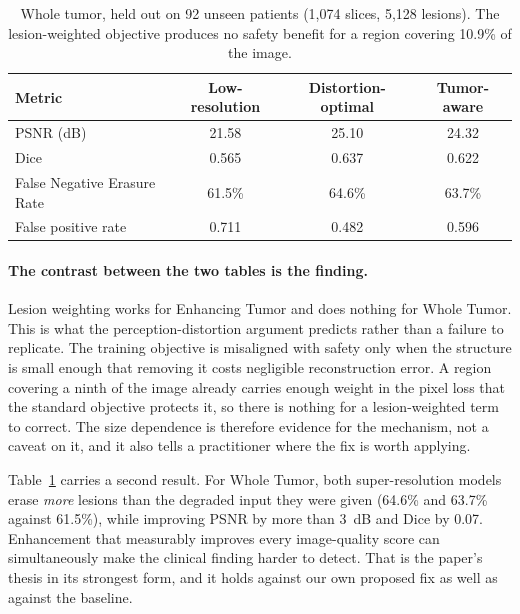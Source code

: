 \documentclass[11pt,a4paper]{article}
\newcommand{\FNER}{False Negative Erasure Rate\xspace}
\newcommand{\SR}{super-resolution\xspace}
\begin{document}
\begin{table}[h]
  \caption{Whole tumor, held out on 92 unseen patients (1,074 slices, 5,128 lesions). The lesion-weighted objective produces no safety benefit for a region covering 10.9\% of the image.}
  \label{tab:curve}
  \centering
  \renewcommand{\arraystretch}{1.15}
  \begin{tabular}{@{}lccc@{}}
    \toprule
    \textbf{Metric} & \textbf{Low-resolution} & \textbf{Distortion-optimal} & \textbf{Tumor-aware} \\
    \midrule
    PSNR (dB)     & 21.58 & 25.10 & 24.32 \\
    Dice          & 0.565 & 0.637 & 0.622 \\
    \FNER         & 61.5\% & 64.6\% & 63.7\% \\
    False positive rate & 0.711 & 0.482 & 0.596 \\
    \bottomrule
  \end{tabular}
\end{table}

\paragraph{The contrast between the two tables is the finding.}
Lesion weighting works for Enhancing Tumor and does nothing for Whole Tumor. This is what the perception-distortion argument predicts rather than a failure to replicate. The training objective is misaligned with safety only when the structure is small enough that removing it costs negligible reconstruction error. A region covering a ninth of the image already carries enough weight in the pixel loss that the standard objective protects it, so there is nothing for a lesion-weighted term to correct. The size dependence is therefore evidence for the mechanism, not a caveat on it, and it also tells a practitioner where the fix is worth applying.

Table~\ref{tab:curve} carries a second result. For Whole Tumor, both \SR models erase \emph{more} lesions than the degraded input they were given (64.6\% and 63.7\% against 61.5\%), while improving PSNR by more than 3~dB and Dice by 0.07. Enhancement that measurably improves every image-quality score can simultaneously make the clinical finding harder to detect. That is the paper's thesis in its strongest form, and it holds against our own proposed fix as well as against the baseline.
\end{document}
